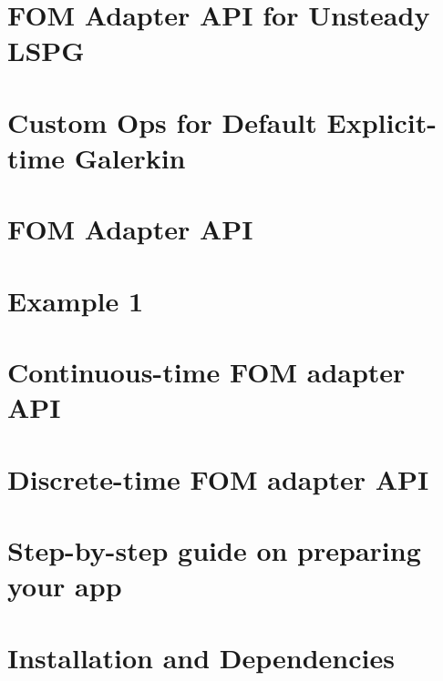 \let\mypdfximage\pdfximage\def\pdfximage{\immediate\mypdfximage}\documentclass[twoside]{book}
\newcommand{\+}{\discretionary{\mbox{\scriptsize$\hookleftarrow$}}{}{}}
\begin{document}
\chapter{F\+OM Adapter A\+PI for Unsteady L\+S\+PG}
\label{md_pages_adapter_apis_adapter_unsteady_lspg_api}

\chapter{Custom Ops for Default Explicit-\/time Galerkin}
\label{md_pages_custom_ops_default_gal_exp}

\chapter{F\+OM Adapter A\+PI}
\label{md_pages_custom_ops}

\chapter{Example 1}
\label{md_pages_examples_example1}

\chapter{Continuous-\/time F\+OM adapter A\+PI}
\label{md_pages_getstarted_adapter_continuous_time_api}

\chapter{Discrete-\/time F\+OM adapter A\+PI}
\label{md_pages_getstarted_adapter_discrete_time_api}

\chapter{Step-\/by-\/step guide on preparing your app}
\label{md_pages_getstarted_adapting_app}

\chapter{Installation and Dependencies}
\label{md_pages_getstarted_build_and_install}

\end{document}
